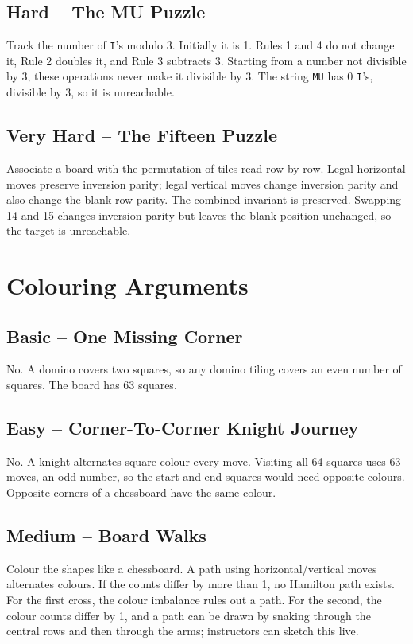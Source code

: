 \documentclass[12pt]{article}
\begin{document}
\subsection*{Hard -- The MU Puzzle}
Track the number of \texttt{I}'s modulo 3. Initially it is 1. Rules 1
and 4 do not change it, Rule 2 doubles it, and Rule 3 subtracts 3.
Starting from a number not divisible by 3, these operations never
make it divisible by 3. The string \texttt{MU} has 0 \texttt{I}'s,
divisible by 3, so it is unreachable.

\subsection*{Very Hard -- The Fifteen Puzzle}
Associate a board with the permutation of tiles read row by row.
Legal horizontal moves preserve inversion parity; legal vertical
moves change inversion parity and also change the blank row parity.
The combined invariant is preserved. Swapping 14 and 15 changes
inversion parity but leaves the blank position unchanged, so the
target is unreachable.

\section{Colouring Arguments}

\subsection*{Basic -- One Missing Corner}
No. A domino covers two squares, so any domino tiling covers an even
number of squares. The board has 63 squares.

\subsection*{Easy -- Corner-To-Corner Knight Journey}
No. A knight alternates square colour every move. Visiting all 64
squares uses 63 moves, an odd number, so the start and end squares
would need opposite colours. Opposite corners of a chessboard have
the same colour.

\subsection*{Medium -- Board Walks}
Colour the shapes like a chessboard. A path using horizontal/vertical
moves alternates colours. If the counts differ by more than 1, no
Hamilton path exists. For the first cross, the colour imbalance rules
out a path. For the second, the colour counts differ by 1, and a path
can be drawn by snaking through the central rows and then through the
arms; instructors can sketch this live.
\end{document}
